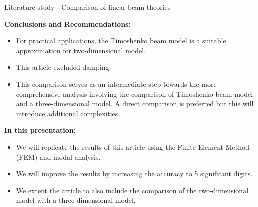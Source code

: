 \documentclass[8pt]{beamer}
\begin{document}
        \begin{frame}{Literature study - Comparison of linear beam theories}
            
            \textbf{Conclusions and Recommendations:}
            \begin{itemize}
              \item For practical applications, the Timoshenko beam model is a suitable approximation for two-dimensional model.
              \item This article excluded damping.
              \item This comparison serves as an intermediate step towards the more comprehensive analysis involving the comparison of Timoshenko beam model and a three-dimensional model. A direct comparison is preferred but this will introduce additional complexities.
            \end{itemize}

            \textbf{In this presentation:}
            \begin{itemize}
              \item We will replicate the results of this article using the Finite Element Method (FEM) and modal analysis.
              \item We will improve the results by increasing the accuracy to 5 significant digits.
              \item We extent the article to also include the comparison of the two-dimensional model with a three-dimensional model.
            \end{itemize}
            
        \end{frame}
\end{document}
